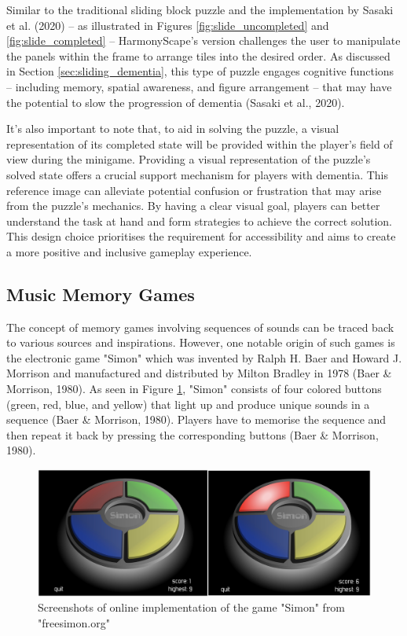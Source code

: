 \documentclass{l4proj}
\begin{document}
Similar to the traditional sliding block puzzle and the implementation by Sasaki et al. (2020) – as illustrated in Figures \ref{fig:slide_uncompleted} and \ref{fig:slide_completed} – HarmonyScape's version challenges the user to manipulate the panels within the frame to arrange tiles into the desired order. As discussed in Section \ref{sec:sliding_dementia}, this type of puzzle engages cognitive functions – including memory, spatial awareness, and figure arrangement – that may have the potential to slow the progression of dementia (Sasaki et al., 2020).

It's also important to note that, to aid in solving the puzzle, a visual representation of its completed state will be provided within the player's field of view during the minigame. Providing a visual representation of the puzzle's solved state offers a crucial support mechanism for players with dementia. This reference image can alleviate potential confusion or frustration that may arise from the puzzle's mechanics. By having a clear visual goal, players can better understand the task at hand and form strategies to achieve the correct solution. This design choice prioritises the requirement for accessibility and aims to create a more positive and inclusive gameplay experience.

\subsection{Music Memory Games}
The concept of memory games involving sequences of sounds can be traced back to various sources and inspirations. However, one notable origin of such games is the electronic game "Simon" which was invented by Ralph H. Baer and Howard J. Morrison and manufactured and distributed by Milton Bradley in 1978 (Baer \& Morrison, 1980). As seen in Figure \ref{fig:simon}, "Simon" consists of four colored buttons (green, red, blue, and yellow) that light up and produce unique sounds in a sequence (Baer \& Morrison, 1980). Players have to memorise the sequence and then repeat it back by pressing the corresponding buttons (Baer \& Morrison, 1980).

\begin{figure}[h]
    \centering
    \includegraphics[width=1.0\linewidth]{dissertation/images/simon.jpg}    

    \caption{Screenshots of online implementation of the game "Simon" from "freesimon.org"
    }

    \label{fig:simon} 
\end{figure}
\end{document}
